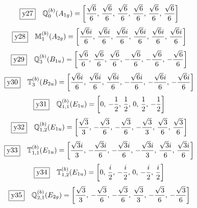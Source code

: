 \documentclass[fleqn,10pt,landscape]{jsarticle}
\begin{document}
\begin{dmath*}
\fbox{y27}\quad \mathbb{Q}_{0}^{(b)}(A_{1g})=\left[ \frac{\sqrt{6}}{6},\, \frac{\sqrt{6}}{6},\, \frac{\sqrt{6}}{6},\, \frac{\sqrt{6}}{6},\, \frac{\sqrt{6}}{6},\, \frac{\sqrt{6}}{6} \right]
\end{dmath*}
\begin{dmath*}
\fbox{y28}\quad \mathbb{M}_{1}^{(b)}(A_{2g})=\left[ \frac{\sqrt{6} i}{6},\, \frac{\sqrt{6} i}{6},\, \frac{\sqrt{6} i}{6},\, \frac{\sqrt{6} i}{6},\, \frac{\sqrt{6} i}{6},\, \frac{\sqrt{6} i}{6} \right]
\end{dmath*}
\begin{dmath*}
\fbox{y29}\quad \mathbb{Q}_{3}^{(b)}(B_{1u})=\left[ \frac{\sqrt{6}}{6},\, \frac{\sqrt{6}}{6},\, \frac{\sqrt{6}}{6},\, - \frac{\sqrt{6}}{6},\, - \frac{\sqrt{6}}{6},\, - \frac{\sqrt{6}}{6} \right]
\end{dmath*}
\begin{dmath*}
\fbox{y30}\quad \mathbb{T}_{3}^{(b)}(B_{2u})=\left[ \frac{\sqrt{6} i}{6},\, \frac{\sqrt{6} i}{6},\, \frac{\sqrt{6} i}{6},\, - \frac{\sqrt{6} i}{6},\, - \frac{\sqrt{6} i}{6},\, - \frac{\sqrt{6} i}{6} \right]
\end{dmath*}
\begin{dmath*}
\fbox{y31}\quad \mathbb{Q}_{1,1}^{(b)}(E_{1u})=\left[ 0,\, - \frac{1}{2},\, \frac{1}{2},\, 0,\, \frac{1}{2},\, - \frac{1}{2} \right]
\end{dmath*}
\begin{dmath*}
\fbox{y32}\quad \mathbb{Q}_{1,2}^{(b)}(E_{1u})=\left[ \frac{\sqrt{3}}{3},\, - \frac{\sqrt{3}}{6},\, - \frac{\sqrt{3}}{6},\, - \frac{\sqrt{3}}{3},\, \frac{\sqrt{3}}{6},\, \frac{\sqrt{3}}{6} \right]
\end{dmath*}
\begin{dmath*}
\fbox{y33}\quad \mathbb{T}_{1,1}^{(b)}(E_{1u})=\left[ \frac{\sqrt{3} i}{3},\, - \frac{\sqrt{3} i}{6},\, - \frac{\sqrt{3} i}{6},\, - \frac{\sqrt{3} i}{3},\, \frac{\sqrt{3} i}{6},\, \frac{\sqrt{3} i}{6} \right]
\end{dmath*}
\begin{dmath*}
\fbox{y34}\quad \mathbb{T}_{1,2}^{(b)}(E_{1u})=\left[ 0,\, \frac{i}{2},\, - \frac{i}{2},\, 0,\, - \frac{i}{2},\, \frac{i}{2} \right]
\end{dmath*}
\begin{dmath*}
\fbox{y35}\quad \mathbb{Q}_{2,1}^{(b)}(E_{2g})=\left[ \frac{\sqrt{3}}{3},\, - \frac{\sqrt{3}}{6},\, - \frac{\sqrt{3}}{6},\, \frac{\sqrt{3}}{3},\, - \frac{\sqrt{3}}{6},\, - \frac{\sqrt{3}}{6} \right]
\end{dmath*}
\end{document}
